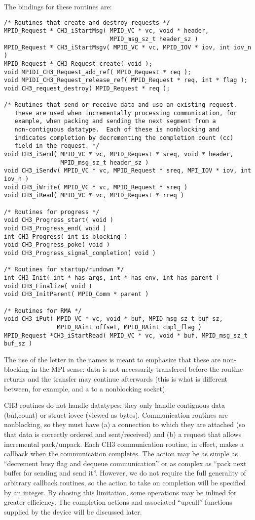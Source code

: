 \documentclass{article}
\begin{document}
The bindings for these routines are:
\begin{verbatim}
/* Routines that create and destroy requests */
MPID_Request * CH3_iStartMsg( MPID_VC * vc, void * header,
                              MPID_msg_sz_t header_sz )
MPID_Request * CH3_iStartMsgv( MPID_VC * vc, MPID_IOV * iov, int iov_n )
MPID_Request * CH3_Request_create( void );
void MPIDI_CH3_Request_add_ref( MPID_Request * req );
void MPIDI_CH3_Request_release_ref( MPID_Request * req, int * flag );
void CH3_request_destroy( MPID_Request * req );

/* Routines that send or receive data and use an existing request.
   These are used when incrementally processing communication, for
   example, when packing and sending the next segment from a
   non-contiguous datatype.  Each of these is nonblocking and
   indicates completion by decrementing the completion count (cc)
   field in the request. */
void CH3_iSend( MPID_VC * vc, MPID_Request * sreq, void * header,
                MPID_msg_sz_t header_sz )
void CH3_iSendv( MPID_VC * vc, MPID_Request * sreq, MPI_IOV * iov, int iov_n )
void CH3_iWrite( MPID_VC * vc, MPID_Request * sreq )
void CH3_iRead( MPID_VC * vc, MPID_Request * rreq )

/* Routines for progress */
void CH3_Progress_start( void )
void CH3_Progress_end( void )
int CH3_Progress( int is_blocking )
void CH3_Progress_poke( void )
void CH3_Progress_signal_completion( void )

/* Routines for startup/rundown */
int CH3_Init( int * has_args, int * has_env, int has_parent )
void CH3_Finalize( void )
void CH3_InitParent( MPID_Comm * parent )

/* Routines for RMA */
void CH3_iPut( MPID_VC * vc, void * buf, MPID_msg_sz_t buf_sz,
               MPID_RAint offset, MPID_RAint cmpl_flag )
MPID_Request *CH3_iStartRead( MPID_VC * vc, void * buf, MPID_msg_sz_t buf_sz )
\end{verbatim}

The use of the letter  in the names is meant to emphasize that these
are non-blocking in the MPI sense: data is not necessarily transfered before
the routine returns and the transfer may continue afterwards (this is what is
different between, for example,  and a  to a
nonblocking socket).

CH3 routines do not handle datatypes; they only handle contiguous data
(buf,count) or struct iovec (viewed as bytes).  Communication routines
are nonblocking, so they must have (a) a connection to which they are
attached (so that data is correctly ordered and sent/received) and (b)
a request that allows incremental pack/unpack.  Each CH3 communication
routine, in effect, makes a callback when the communication completes.
The action may be as simple as ``decrement busy flag and dequeue
communication'' or as complex as ``pack next buffer for sending and
send it''.  However, we do not require the full generality of
arbitrary callback routines, so the action to take on completion will
be specified by an integer.  By chosing this limitation, some
operations may be inlined for greater efficiency.  The completion
actions and associated ``upcall'' functions supplied by the device will be
discussed later.
\end{document}
